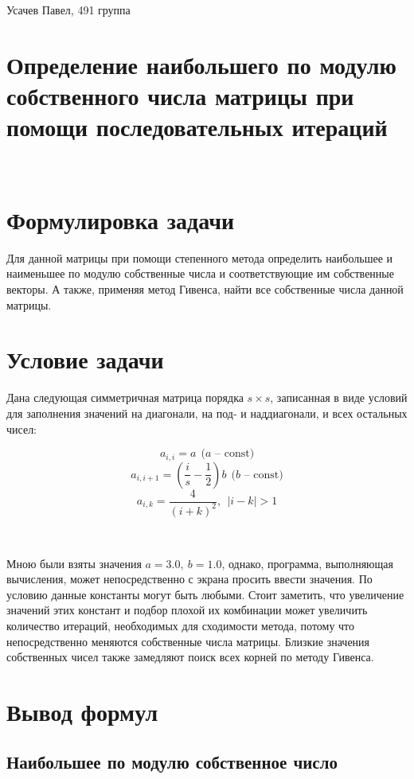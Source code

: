 \documentclass[12pt,a4paper]{article}
\begin{document}
\begin{flushleft}
\large Усачев Павел, 491 группа
\end{flushleft}

\section*{Определение наибольшего по модулю собственного числа матрицы при помощи последовательных итераций}

\

\section{Формулировка задачи}
Для данной матрицы при помощи степенного метода определить наибольшее и наименьшее по модулю собственные числа и соответствующие им собственные векторы. А также, применяя метод Гивенса, найти все собственные числа данной матрицы.

\section{Условие задачи}

Дана следующая симметричная матрица порядка $ s \times s $, записанная в виде условий для заполнения значений на диагонали, на под- и наддиагонали, и всех остальных чисел:

$$ a_{i,i} = a \ \ \text{($a$ -- const)} $$
$$ a_{i,i+1} = \left(\frac{i}{s}-\frac{1}{2}\right)b \ \ \text{($b$ -- const)}$$
$$ a_{i,k} = \frac{4}{(i+k)^2}, \ \ |i-k|>1 $$

\

Мною были взяты значения $a=3.0, \ b=1.0$, однако, программа, выполняющая вычисления, может непосредственно с экрана просить ввести значения. По условию данные константы могут быть любыми. Стоит заметить, что увеличение значений этих констант и подбор плохой их комбинации может увеличить количество итераций, необходимых для сходимости метода, потому что непосредственно меняются собственные числа матрицы. Близкие значения собственных чисел также замедляют поиск всех корней по методу Гивенса.

\section{Вывод формул}

\subsection{Наибольшее по модулю собственное число}
\end{document}
